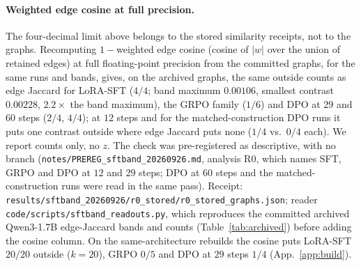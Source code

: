 \documentclass{article}
\begin{document}
\paragraph{Weighted edge cosine at full precision.} The four-decimal limit above belongs to the stored similarity receipts, not to the graphs. Recomputing $1-{}$weighted edge cosine (cosine of $|w|$ over the union of retained edges) at full floating-point precision from the committed graphs, for the same runs and bands, gives, on the archived graphs, the same outside counts as edge Jaccard for LoRA-SFT ($4/4$; band maximum $0.00106$, smallest contrast $0.00228$, $2.2\times$ the band maximum), the GRPO family ($1/6$) and DPO at $29$ and $60$ steps ($2/4$, $4/4$); at $12$ steps and for the matched-construction DPO runs it puts one contrast outside where edge Jaccard puts none ($1/4$ vs.\ $0/4$ each). We report counts only, no $z$. The check was pre-registered as descriptive, with no branch (\texttt{notes/PREREG\_sftband\_20260926.md}, analysis R0, which names SFT, GRPO and DPO at $12$ and $29$ steps; DPO at $60$ steps and the matched-construction runs were read in the same pass). Receipt: \texttt{results/sftband\_20260926/r0\_stored/r0\_stored\_graphs.json}; reader \texttt{code/scripts/sftband\_readouts.py}, which reproduces the committed archived \mbox{Qwen3-1.7B} edge-Jaccard bands and counts (Table~\ref{tab:archived}) before adding the cosine column. On the same-architecture rebuilds the cosine puts LoRA-SFT $20/20$ outside ($k=20$), GRPO $0/5$ and DPO at $29$ steps $1/4$ (App.~\ref{app:build}).
\end{document}
